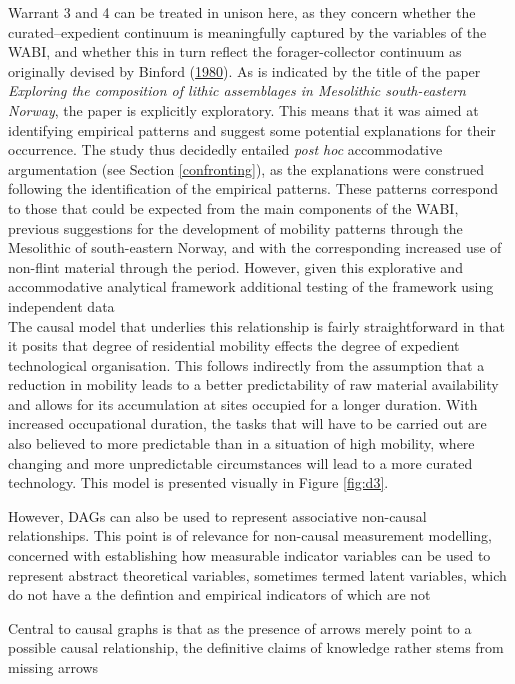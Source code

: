 \documentclass[
  12pt,
  a4paper,
  oneside]{book}
\begin{document}
Warrant 3 and 4 can be treated in unison here, as they concern whether the curated--expedient continuum is meaningfully captured by the variables of the WABI, and whether this in turn reflect the forager-collector continuum as originally devised by Binford (\protect\hyperlink{ref-binford1980}{1980}). As is indicated by the title of the paper \emph{Exploring the composition of lithic assemblages in Mesolithic south-eastern Norway}, the paper is explicitly exploratory. This means that it was aimed at identifying empirical patterns and suggest some potential explanations for their occurrence. The study thus decidedly entailed \emph{post hoc} accommodative argumentation (see Section \ref{confronting}), as the explanations were construed following the identification of the empirical patterns. These patterns correspond to those that could be expected from the main components of the WABI, previous suggestions for the development of mobility patterns through the Mesolithic of south-eastern Norway, and with the corresponding increased use of non-flint material through the period. However, given this explorative and accommodative analytical framework additional testing of the framework using independent data\\
The causal model that underlies this relationship is fairly straightforward in that it posits that degree of residential mobility effects the degree of expedient technological organisation. This follows indirectly from the assumption that a reduction in mobility leads to a better predictability of raw material availability and allows for its accumulation at sites occupied for a longer duration. With increased occupational duration, the tasks that will have to be carried out are also believed to more predictable than in a situation of high mobility, where changing and more unpredictable circumstances will lead to a more curated technology. This model is presented visually in Figure \ref{fig:d3}.

However, DAGs can also be used to represent associative non-causal relationships. This point is of relevance for non-causal measurement modelling, concerned with establishing how measurable indicator variables can be used to represent abstract theoretical variables, sometimes termed latent variables, which do not have a the defintion and empirical indicators of which are not

Central to causal graphs is that as the presence of arrows merely point to a possible causal relationship, the definitive claims of knowledge rather stems from missing arrows
\end{document}
